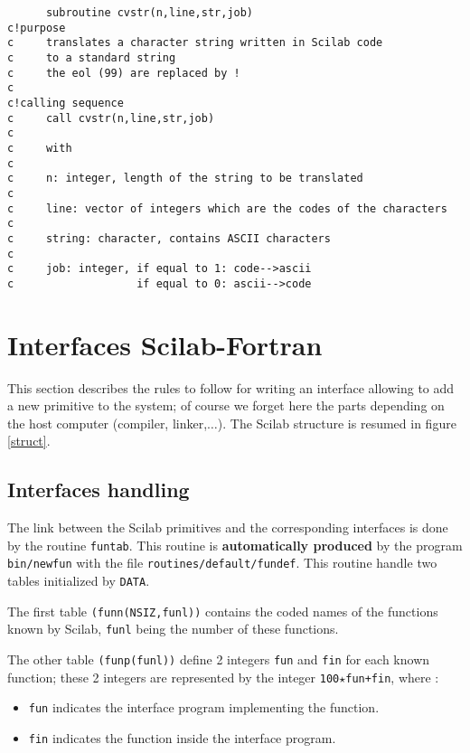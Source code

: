 \begin{verbatim}
      subroutine cvstr(n,line,str,job)
c!purpose
c     translates a character string written in Scilab code
c     to a standard string
c     the eol (99) are replaced by !
c
c!calling sequence
c     call cvstr(n,line,str,job)
c
c     with
c
c     n: integer, length of the string to be translated
c
c     line: vector of integers which are the codes of the characters
c
c     string: character, contains ASCII characters
c
c     job: integer, if equal to 1: code-->ascii
c                   if equal to 0: ascii-->code
\end{verbatim}


\section{Interfaces Scilab-Fortran}

This section describes the rules to follow for writing an interface
allowing to add a new primitive to the system; of course we forget here
the parts depending on the host computer (compiler, linker,$\ldots $).
The Scilab structure is resumed in figure  \ref{struct}.   

\subsection{Interfaces handling}

The link between the Scilab primitives and the corresponding interfaces
is done by the routine  {\tt funtab}. 
\label{funtab}
This routine is {\bf automatically produced} by the program {\tt bin/newfun}
with the file  {\tt routines/default/fundef}.\label{fundef}
This routine handle two tables initialized by {\tt   DATA}.

The first table {\tt (funn(NSIZ,funl))} contains the coded names of the 
functions known by Scilab, \verb!funl! being the number of these functions.

The other table {\tt (funp(funl))}  define 2 integers \verb!fun! and
\verb!fin! for each known function; these 2 integers are represented by the
integer {\tt 100}$\star${\tt fun+fin}, where :

\begin{itemize}

\item{\tt fun} indicates the interface program implementing the function.

\item{\tt fin} indicates the function inside the interface program.

\end{itemize}


